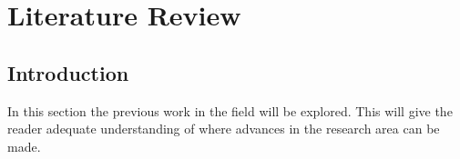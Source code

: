
\chapter{Literature Review} %

\label{Chapter2} %


\section{Introduction}

In this section the previous work in the field will be explored. This will give the reader adequate understanding of where 
advances in the research area can be made.

